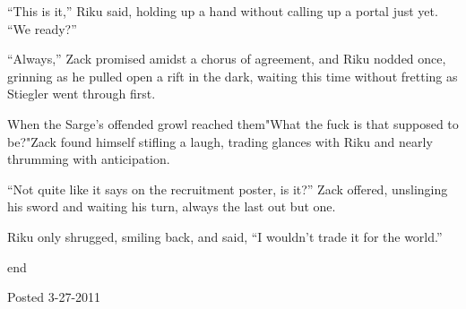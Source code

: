 ``This is it,'' Riku said, holding up a hand without calling up a portal just yet. ``We ready?''

``Always,'' Zack promised amidst a chorus of agreement, and Riku nodded once, grinning as he pulled open a rift in the dark, waiting this time without fretting as Stiegler went through first.

When the Sarge's offended growl reached them\textemdash "What the fuck is that supposed to be?"\textemdash Zack found himself stifling a laugh, trading glances with Riku and nearly thrumming with anticipation.

``Not quite like it says on the recruitment poster, is it?'' Zack offered, unslinging his sword and waiting his turn, always the last out but one.

Riku only shrugged, smiling back, and said, ``I wouldn't trade it for the world.''


end

Posted 3-27-2011